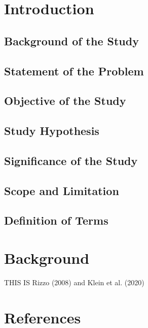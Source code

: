 \documentclass[
  12pt,
  a4paper,
]{article}
\numberwithin{equation}{section}
\begin{document}
\section{Introduction}\label{introduction}

\subsection{Background of the Study}\label{background-of-the-study}

\subsection{Statement of the Problem}\label{statement-of-the-problem}

\subsection{Objective of the Study}\label{objective-of-the-study}

\subsection{Study Hypothesis}\label{study-hypothesis}

\subsection{Significance of the Study}\label{significance-of-the-study}

\subsection{Scope and Limitation}\label{scope-and-limitation}

\subsection{Definition of Terms}\label{definition-of-terms}

\section{Background}\label{background}

THIS IS Rizzo (2008) and Klein et al. (2020)

\section*{References}\label{references}
\end{document}
